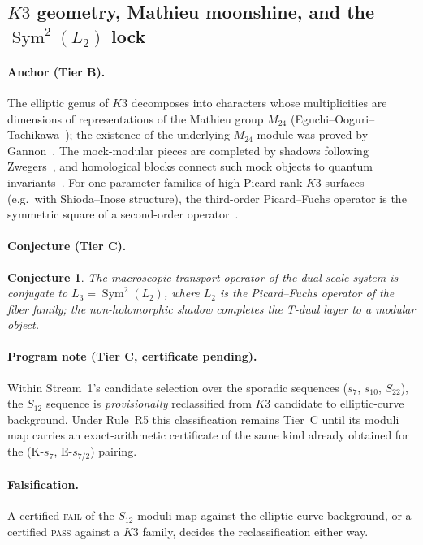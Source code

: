 \documentclass[11pt,a4paper]{article}
\theoremstyle{plain}
\newtheorem{conjecture}{Conjecture}
\theoremstyle{definition}
\theoremstyle{remark}
\newcommand{\tierB}{\textbf{Tier B}}
\newcommand{\tierC}{\textbf{Tier C}}
\begin{document}
\subsection{$K3$ geometry, Mathieu moonshine, and the
$\operatorname{Sym}^{2}(L_{2})$ lock}\label{sec:k3}

\paragraph{Anchor (\tierB{}).} The elliptic genus of $K3$ decomposes into
characters whose multiplicities are dimensions of representations of the
Mathieu group $M_{24}$ (Eguchi--Ooguri--Tachikawa~\cite{EOT2011}); the
existence of the underlying $M_{24}$-module was proved by
Gannon~\cite{Gannon2016}. The mock-modular pieces are completed by shadows
following Zwegers~\cite{Zwegers2002}, and homological blocks connect such
mock objects to quantum invariants~\cite{GPPV2020}. For one-parameter
families of high Picard rank $K3$ surfaces (e.g.\ with Shioda--Inose
structure), the third-order Picard--Fuchs operator is the symmetric square
of a second-order operator~\cite{Doran2000}.

\paragraph{Conjecture (\tierC{}).}
\begin{conjecture}\label{conj:lock}
The macroscopic transport operator of the dual-scale system is conjugate to
$L_{3}=\operatorname{Sym}^{2}(L_{2})$, where $L_{2}$ is the Picard--Fuchs
operator of the fiber family; the non-holomorphic shadow completes the
T-dual layer to a modular object.
\end{conjecture}

\paragraph{Program note (\tierC{}, certificate pending).} Within Stream~1's
candidate selection over the sporadic sequences ($s_{7}$, $s_{10}$,
$S_{22}$), the $S_{12}$ sequence is \emph{provisionally} reclassified from
$K3$ candidate to elliptic-curve background. Under Rule~R5 this
classification remains Tier~C until its moduli map carries an
exact-arithmetic certificate of the same kind already obtained for the
(K-$s_{7}$, E-$s_{7/2}$) pairing.

\paragraph{Falsification.} A certified \textsc{fail} of the $S_{12}$ moduli
map against the elliptic-curve background, or a certified \textsc{pass}
against a $K3$ family, decides the reclassification either way.
\end{document}
